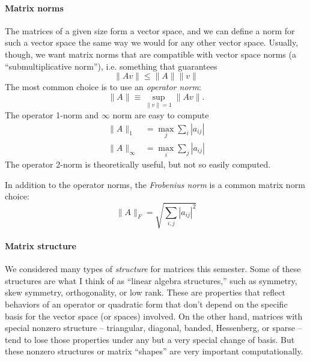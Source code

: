 \documentclass[12pt, leqno]{article}
\begin{document}
\paragraph{Matrix norms}
The matrices of a given size form a vector space, and we can define
a norm for such a vector space the same way we would for any other
vector space.  Usually, though, we want matrix norms that are compatible with
vector space norms (a ``submultiplicative norm''), i.e. something that
guarantees
\[
  \|Av\| \leq \|A\| \|v\|
\]
The most common choice is to use an {\em operator norm}:
\[
  \|A\| \equiv \sup_{\|v\| = 1} \|Av\|.
\]
The operator 1-norm and $\infty$ norm are easy to compute
\begin{align*}
  \|A\|_1 &= \max_j \sum_i |a_{ij}| \\
  \|A\|_\infty &= \max_i \sum_j |a_{ij}|
\end{align*}
The operator 2-norm is theoretically useful, but not so easily computed.

In addition to the operator norms, the {\em Frobenius norm} is a
common matrix norm choice:
\[
  \|A\|_F = \sqrt{ \sum_{i,j} |a_{ij}|^2}
\]

\paragraph{Matrix structure}
We considered many types of {\em structure} for matrices this
semester.  Some of these structures are what I think of as ``linear
algebra structures,'' such as symmetry, skew symmetry, orthogonality,
or low rank.  These are properties that reflect behaviors of an
operator or quadratic form that don't depend on the specific basis for
the vector space (or spaces) involved.  On the other hand, matrices
with special nonzero structure -- triangular, diagonal, banded,
Hessenberg, or sparse -- tend to lose those properties under any but a
very special change of basis.  But these nonzero structures or matrix
``shapes'' are very important computationally.
\end{document}
